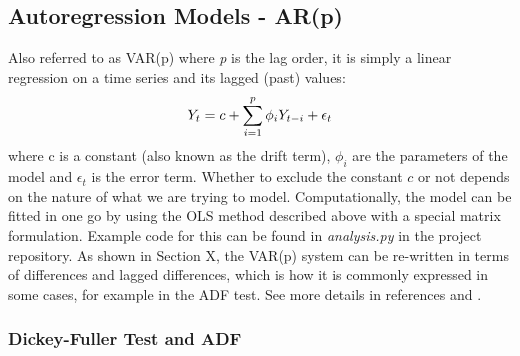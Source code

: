 \documentclass[11pt]{article}
\begin{document}
\begin{appendices}
    \subsection{Autoregression Models - AR(p)}\label{autoregression-models---arp}
    
Also referred to as VAR(p) where \emph{p} is the lag order, it is
simply a linear regression on a time series and its lagged (past)
values:
\begin{equation}
Y_t = c + \sum^{p}_{i=1} \phi_i Y_{t-i} + \epsilon_t \\
\end{equation}
where c is a constant (also known as the drift term), \(\phi_i\) are the
parameters of the model and \(\epsilon_t\) is the error term. Whether to
exclude the constant \(c\) or not depends on the nature of what we are
trying to model.
Computationally, the model can be fitted in one go by using the OLS
method described above with a special matrix formulation. Example code
for this can be found in \emph{analysis.py} in the project repository.
As shown in Section X, the VAR(p) system can be re-written in terms of
differences and lagged differences, which is how it is commonly expressed
in some cases, for example in the ADF test. See more details in references \cite{wikiVAR} and \cite{wikiAR}.


    \subsubsection{Dickey-Fuller Test and ADF}\label{dickey-fuller-test-and-adf}
    

\end{appendices}
\end{document}
